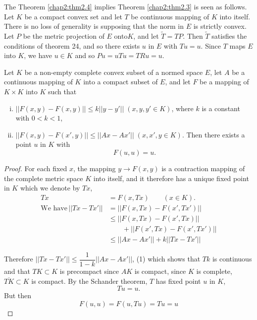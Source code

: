 The Theorem \ref{chap2:thm2.4} implies Theorem \ref{chap2:thm2.3} is
seen as follows. Let $K$ be a 
compact convex set and let $T$ be continuous mapping of $K$ into
itself. There is no loss of generality is supposing that the norm in
$E$ is strictly convex. Let $P$ be the metric projection of $E$
onto\pageoriginale $K$, and let $\tilde{T} = TP$. Then $\tilde{T}$
satisfies the 
conditions of theorem 24, and so there exists $u$ in $E$ with $T u =
u$. Since $T$ maps $E$ into $K$, we have $u \in K$ and so $Pu = u Tu =
TRu = u$. 

\begin{lemma}\label{chap2:lem2.5}%
  Let $K$ be a non-empty complete convex subset of a normed space $E$,
  let $A$ be a continuous mapping of $K$ into a compact subset of $E$,
  and let $F$ be a mapping of $K  \times K$ into $K$ such that 
\begin{enumerate}[(i)]
\item $|| F (x, y) - F (x, y) || \le k || y - y' || \; (x, y, y' \in
  K)$, where $k$ is a constant with $0 < k < 1$, 

\item $||F (x, y) - F(x', y)|| \le ||Ax - Ax'|| \; (x, x', y \in
  K)$. Then there exists a point $u$ in $K$ with 
  $$
  F(u, u) = u.
  $$
\end{enumerate}
\end{lemma}

\begin{proof}
  For each fixed $x$, the mapping $y \to F (x, y)$ is a contraction
  mapping of the complete metric space $K$ into itself, and it
  therefore has a unique fixed point in $K$ which we denote by $Tx$, 
  \begin{align*}
    Tx & = F(x, Tx) \qquad (x \in K).\\
    \text{We have}\, || Tx - Tx' || &= || F (x, Tx) - F(x', Tx')||\\
    & \le || F(x, Tx) - F(x', Tx)||\\
    &\qquad{}+ || F(x', Tx) - F(x', Tx') ||\\
    & \le || Ax - Ax' || + k || Tx - Tx'|| \tag*{$\Box$}
\end{align*}

Therefore $||Tx - Tx'|| \le \dfrac{1}{1 - k} || Ax - Ax' ||$, 
(1) which shows that $Tk$ is continuous and that $TK \subset K$ is
precompact since $AK$ is compact, since $K$ is complete,
$\overline{TK} \subset K$ is compact. By the Schander theorem, $T$ has
fixed point $u$ in $K$, 
$$
Tu = u.
$$\pageoriginale
But then
$$
F(u, u) = F(u, Tu) = Tu = u
$$
\end{proof}

